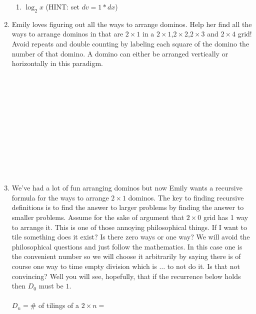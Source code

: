 \documentclass[12pt]{article}
\begin{document}
\begin{enumerate}
\begin{enumerate}
\item $\log_{2}{x}$  (HINT: set $dv=1*dx$)
\end{enumerate}
\newpage
\item Emily loves figuring out all the ways to arrange dominos. Help her find all the ways to arrange dominos in that are 
$2 \times 1$ in a $2 \times 1$,$2 \times 2$,$2 \times 3$ and $2 \times 4$ grid! Avoid repeats and 
double counting by labeling each square of the domino the number of that domino. A domino can either be 
arranged vertically or horizontally in this paradigm.\\\\\\\\\\\\\\\\\\\\\\\\
\item We've had a lot of fun arranging dominos but now Emily wants a recursive formula for the ways to arrange 
$2 \times 1$ dominos. The key to finding recursive definitions is to find the answer to larger problems by finding 
the answer to smaller problems. Assume for the sake of argument that $2 \times 0$ grid has 1 way to arrange it. This 
is one of those annoying philosophical things. If I want to tile something does it exist? Is there 
zero ways or one way? We will avoid the philosophical questions and just follow the mathematics. In this case 
one is the convenient number so we will choose it arbitrarily by saying there is of course 
one way to time empty division which is $\dots$ to not do it. Is that not convincing? Well you will see, 
hopefully, that if the recurrence below holds then $D_0$ must be $1$.\\\\
$D_n = $\# of tilings of a $2 \times n =$
\newpage
\end{enumerate}
\end{document}
